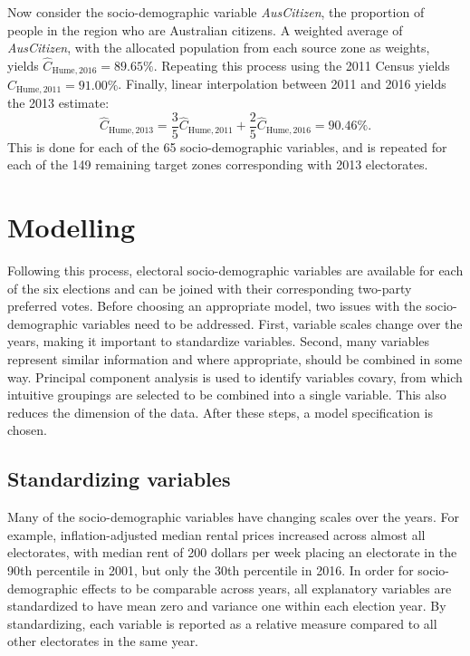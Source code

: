 \documentclass[times, doublespace]{anzsauth}
\begin{document}
Now consider the socio-demographic variable \emph{AusCitizen}, the proportion of people in the region who are Australian citizens. A weighted average of \emph{AusCitizen}, with the allocated population from each source zone as weights, yields \(\hat{C}_{\text{Hume},2016} = 89.65\%\). Repeating this process using the 2011 Census yields \(\hat{C}_{\text{Hume},2011} = 91.00\%\). Finally, linear interpolation between 2011 and 2016 yields the 2013 estimate:
\[
  \hat{C}_{\text{Hume},2013}
    = \frac{3}{5} \hat{C}_{\text{Hume},2011} + \frac{2}{5} \hat{C}_{\text{Hume},2016}
    =  90.46\%.
\]
This is done for each of the 65 socio-demographic variables, and is repeated for each of the 149 remaining target zones corresponding with 2013 electorates.

\hypertarget{modelling}{%
\section{Modelling}\label{modelling}}

Following this process, electoral socio-demographic variables are available for each of the six elections and can be joined with their corresponding two-party preferred votes. Before choosing an appropriate model, two issues with the socio-demographic variables need to be addressed. First, variable scales change over the years, making it important to standardize variables. Second, many variables represent similar information and where appropriate, should be combined in some way. Principal component analysis is used to identify variables covary, from which intuitive groupings are selected to be combined into a single variable. This also reduces the dimension of the data. After these steps, a model specification is chosen.

\hypertarget{standardizing-variables}{%
\subsection{Standardizing variables}\label{standardizing-variables}}

Many of the socio-demographic variables have changing scales over the years. For example, inflation-adjusted median rental prices increased across almost all electorates, with median rent of 200 dollars per week placing an electorate in the 90th percentile in 2001, but only the 30th percentile in 2016. In order for socio-demographic effects to be comparable across years, all explanatory variables are standardized to have mean zero and variance one within each election year. By standardizing, each variable is reported as a relative measure compared to all other electorates in the same year.
\end{document}
